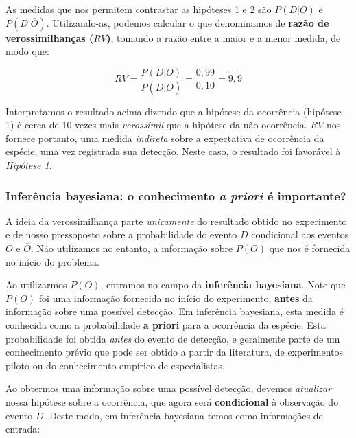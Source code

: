 \documentclass[
]{book}
\begin{document}
As medidas que nos permitem contrastar as hipóteses 1 e 2 são \(P(D|O)\) e \(P(D|\overline{O})\). Utilizando-as, podemos calcular o que denominamos de \textbf{razão de verossimilhanças (\(RV\))}, tomando a razão entre a maior e a menor medida, de modo que:

\[RV = \frac{P(D|O)}{P(D|\overline{O})} = \frac{0,99}{0,10} = 9,9\]

Interpretamos o resultado acima dizendo que a hipótese da ocorrência (hipótese 1) é cerca de 10 vezes mais \emph{verossímil} que a hipótese da não-ocorrência. \(RV\) nos fornece portanto, uma medida \emph{indireta} sobre a expectativa de ocorrência da espécie, uma vez registrada sua detecção. Neste caso, o resultado foi favorável à \emph{Hipótese 1}.

\hypertarget{inferuxeancia-bayesiana-o-conhecimento-a-priori-uxe9-importante}{%
\subsubsection*{\texorpdfstring{Inferência bayesiana: o conhecimento \emph{a priori} é importante?}{Inferência bayesiana: o conhecimento a priori é importante?}}\label{inferuxeancia-bayesiana-o-conhecimento-a-priori-uxe9-importante}}

A ideia da verossimilhança parte \emph{unicamente} do resultado obtido no experimento e de nosso pressoposto sobre a probabilidade do evento \(D\) condicional aos eventos \(O\) e \(\overline{O}\). Não utilizamos no entanto, a informação sobre \(P(O)\) que nos é fornecida no início do problema.

Ao utilizarmos \(P(O)\), entramos no campo da \textbf{inferência bayesiana}. Note que \(P(O)\) foi uma informação fornecida no início do experimento, \textbf{antes} da informação sobre uma possível detecção. Em inferência bayesiana, esta medida é conhecida como a probabilidade \textbf{a priori} para a ocorrência da espécie. Esta probabilidade foi obtida \emph{antes} do evento de detecção, e geralmente parte de um conhecimento prévio que pode ser obtido a partir da literatura, de experimentos piloto ou do conhecimento empírico de especialistas.

Ao obtermos uma informação sobre uma possível detecção, devemos \emph{atualizar} nossa hipótese sobre a ocorrência, que agora será \textbf{condicional} à observação do evento \(D\). Deste modo, em inferência bayesiana temos como informações de entrada:
\end{document}

